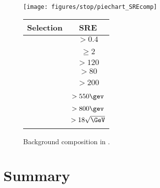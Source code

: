 				\begin{figure}[!htb]
					\centering
					\begin{minipage}[]{.5\textwidth}
						\centering
						\vspace{0pt}
						\texttt{[image: figures/stop/piechart\_SREcomp]}
						\caption{Background composition in \SRE.}
						\label{fig:SRE_bkgcomp}
					\end{minipage}\hfill
					\begin{minipage}[!htb]{.5\textwidth}
						\centering
						\vspace{0pt}
						\def\arraystretch{1.4}
							\begin{tabular}{lc}\toprule
							   {\textbf{Selection}}    & {\textbf{SRE}}\\
							   \toprule
							   \dphijetthreemet  & $>0.4$             \\ %
							   \nBJet   & $\geq$2            \\     %
							   \mantikteightzero & $>120$ \gev        \\     %
							   \mantikteightone  & $>80$ \gev         \\     %
							   \mtbmin\          & $>200$ \gev        \\     %
							   \met\             & $> 550 \gev$       \\     %
							   \HT               & $>800 \gev$        \\     %
							   \htsig            & $> 18 \sqrt{\GeV}$ \\     
							   \bottomrule
							   \label{tab:SignalRegionE}
							\end{tabular}
					\end{minipage}
				\end{figure}


	\section{Summary}

